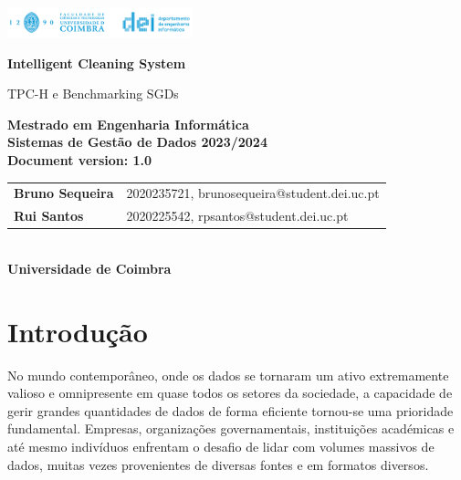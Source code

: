 \documentclass{article}
\begin{document}
\begin{titlepage}
    \centering
    \vspace*{1cm}

    \includegraphics[width=0.4\textwidth]{dei_thumb.png} %

    \vspace{1.5cm}
    {\LARGE \textbf{Intelligent Cleaning System} \par}
   
    {\Large TPC-H e Benchmarking SGDs \par}

    \vspace{2.5cm}
    \textbf{Mestrado em Engenharia Informática} \\
    \textbf{Sistemas de Gestão de Dados 2023/2024} \\
    \vspace{0.5cm} 
    \textbf{Document version: 1.0} \\
    \vspace{3cm}
    \begin{tabular}{ll}
        \textbf{Bruno Sequeira} & 2020235721, brunosequeira@student.dei.uc.pt \\
        \textbf{Rui Santos} & 2020225542, rpsantos@student.dei.uc.pt
        
      
    \end{tabular}\\
    \vspace{1.5cm} 
    \textbf{Universidade de Coimbra}

    \date{}

    \vfill

\end{titlepage}
   

\clearpage
\section{Introdução}
\quad No mundo contemporâneo, onde os dados se tornaram um ativo extremamente valioso e omnipresente em quase todos os setores da sociedade, a capacidade de gerir grandes quantidades de dados de forma eficiente tornou-se uma prioridade fundamental. Empresas, organizações governamentais, instituições académicas e até mesmo indivíduos enfrentam o desafio de lidar com volumes massivos de dados, muitas vezes provenientes de diversas fontes e em formatos diversos.\\
\end{document}
